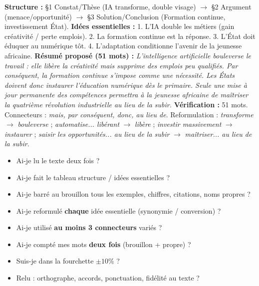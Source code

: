 \documentclass[11pt]{article}
\begin{document}
\begin{corrige}
\textbf{Structure :} §1 Constat/Thèse (IA transforme, double visage) $\rightarrow$ §2 Argument (menace/opportunité) $\rightarrow$ §3 Solution/Conclusion (Formation continue, investissement État).
\textbf{Idées essentielles :} 1. L'IA double les métiers (gain créativité / perte emplois). 2. La formation continue est la réponse. 3. L'État doit éduquer au numérique tôt. 4. L'adaptation conditionne l'avenir de la jeunesse africaine.
\textbf{Résumé proposé (51 mots) :}
\emph{L'intelligence artificielle bouleverse le travail : elle libère la créativité mais supprime des emplois peu qualifiés. Par conséquent, la formation continue s'impose comme une nécessité. Les États doivent donc instaurer l'éducation numérique dès le primaire. Seule une mise à jour permanente des compétences permettra à la jeunesse africaine de maîtriser la quatrième révolution industrielle au lieu de la subir.}
\textbf{Vérification :} 51 mots. Connecteurs : \emph{mais, par conséquent, donc, au lieu de}. Reformulation : \emph{transforme} $\rightarrow$ \emph{bouleverse} ; \emph{automatise... libérant} $\rightarrow$ \emph{libère} ; \emph{investir massivement} $\rightarrow$ \emph{instaurer} ; \emph{saisir les opportunités... au lieu de la subir} $\rightarrow$ \emph{maîtriser... au lieu de la subir}.
\end{corrige}

\begin{aretenir}
\begin{itemize}
\item [ ] Ai-je lu le texte deux fois ?
\item [ ] Ai-je fait le tableau structure / idées essentielles ?
\item [ ] Ai-je barré au brouillon tous les exemples, chiffres, citations, noms propres ?
\item [ ] Ai-je reformulé \textbf{chaque} idée essentielle (synonymie / conversion) ?
\item [ ] Ai-je utilisé \textbf{au moins 3 connecteurs} variés ?
\item [ ] Ai-je compté mes mots \textbf{deux fois} (brouillon + propre) ?
\item [ ] Suis-je dans la fourchette $\pm 10\%$ ?
\item [ ] Relu : orthographe, accords, ponctuation, fidélité au texte ?
\end{itemize}
\end{aretenir}
\end{document}
